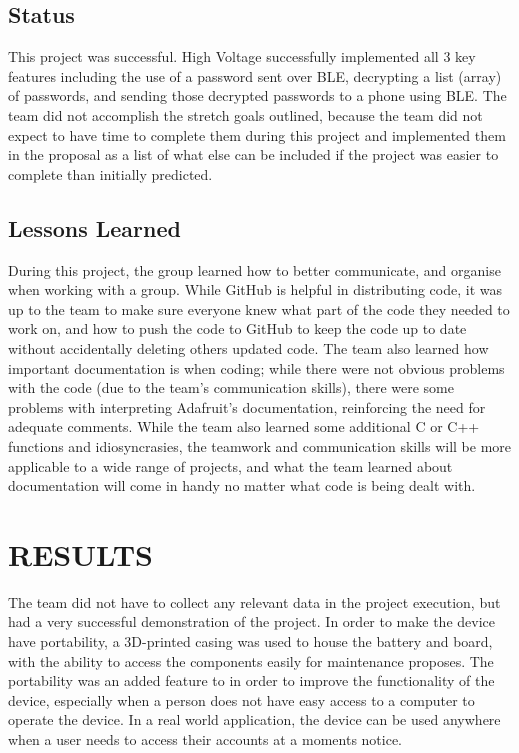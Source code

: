 \documentclass[12pt]{article}
\begin{document}
\subsection{Status}

\hspace{1cm}This project was successful. High Voltage successfully implemented all 3 key features including the use of a password sent over BLE, decrypting a list (array) of passwords, and sending those decrypted passwords to a phone using BLE. The team did not accomplish the stretch goals outlined, because the team did not expect to have time to complete them during this project and implemented them in the proposal as a list of what else can be included if the project was easier to complete than initially predicted. 

\subsection{Lessons Learned}

\hspace{1cm}During this project, the group learned how to better communicate, and organise when working with a group. While GitHub is helpful in distributing code, it was up to the team to make sure everyone knew what part of the code they needed to work on, and how to push the code to GitHub to keep the code up to date without accidentally deleting others updated code. The team also learned how important documentation is when coding; while there were not obvious problems with the code (due to the team's communication skills), there were some problems with interpreting Adafruit's documentation, reinforcing the need for adequate comments. While the team also learned some additional C or C++ functions and idiosyncrasies, the teamwork and communication skills will be more applicable to a wide range of projects, and what the team learned about documentation will come in handy no matter what code is being dealt with.

\section{RESULTS}

\hspace{1cm}The team did not have to collect any relevant data in the project execution, but had a very successful demonstration of the project. In order to make the device have portability, a 3D-printed casing was used to house the battery and board, with the ability to access the components easily for maintenance proposes. The portability was an added feature to in order to improve the functionality of the device, especially when a person does not have easy access to a computer to operate the device. In a real world application, the  device can be used anywhere when a user needs to access their accounts at a moments notice. 
\end{document}

